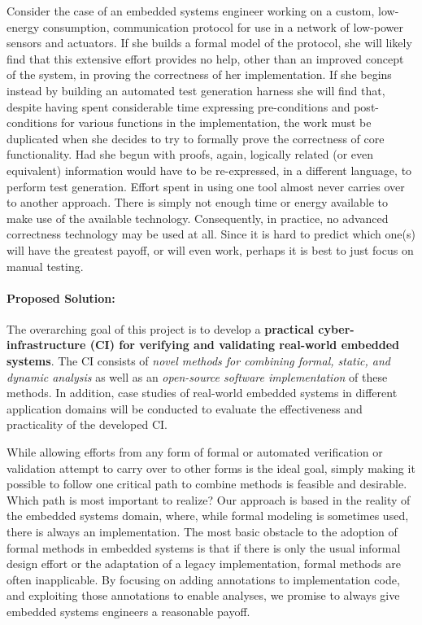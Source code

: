 Consider the case of an embedded systems engineer working on a custom, low-energy consumption, communication protocol for use in a network of low-power sensors and actuators.  If she builds a formal model of the protocol, she will likely find that this extensive effort provides no help, other than an improved concept of the system, in proving the correctness of her implementation.  If she begins instead by building an automated test generation harness she will find that, despite having spent considerable time expressing pre-conditions and post-conditions for various functions in the implementation, the work must be duplicated when she decides to try to formally prove the correctness of core functionality.  Had she begun with proofs, again, logically related (or even equivalent) information would have to be re-expressed, in a different language, to perform test generation.  Effort spent in using one tool almost never carries over to another approach.  There is simply not enough time or energy available to make use of the available technology.  Consequently, in practice, no advanced correctness technology may be used at all.  Since it is hard to predict which one(s) will have the greatest payoff, or will even work, perhaps it is best to just focus on manual testing.


\paragraph{Proposed Solution:}
The overarching goal of this project is to develop a \textbf{practical cyber-infrastructure (CI) for verifying and validating real-world embedded systems}.
The CI consists of \emph{novel methods for combining formal, static, and dynamic analysis} as well as an \emph{open-source software implementation} of these methods.
In addition, case studies of real-world embedded systems in different application domains will be conducted to evaluate the effectiveness and practicality of the developed CI.

While allowing efforts from any form of formal or automated verification or validation attempt to carry over to other forms %
is the ideal goal, simply making it possible to follow one critical path to combine methods is feasible and desirable.
%
Which path is most important to realize?  Our approach is based in the reality of the embedded systems domain, where, while formal modeling is sometimes used, there is %
always an implementation.  The most basic obstacle to the adoption of formal methods in embedded systems is that if there is only the usual informal design effort or the adaptation of a legacy implementation, formal methods are often inapplicable.  By focusing on adding annotations to implementation code, and exploiting those annotations to enable analyses, we promise to always give embedded systems engineers a reasonable payoff.

